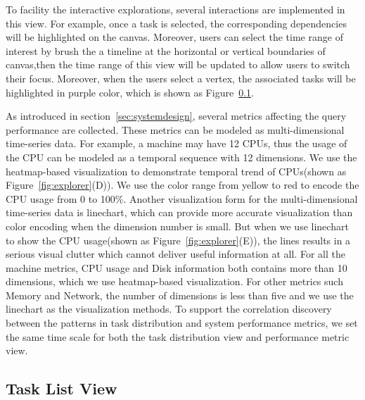 To facility the interactive explorations, several interactions are implemented in this view. For example, once a task is selected, the corresponding dependencies will be highlighted on the canvas. Moreover, users can select the time range of interest by brush the a timeline at the horizontal or vertical boundaries of canvas,then the time range of this view will be updated to allow users to switch their focus. Moreover, when the users select a vertex, the associated tasks will be highlighted in purple color, which is shown as Figure~\ref{}.

As introduced in section~\ref{sec:systemdesign}, several metrics affecting the query performance are collected. These metrics can be modeled as multi-dimensional time-series data. For example, a machine may have 12 CPUs, thus the usage of the CPU can be modeled as a temporal sequence with 12 dimensions. We use the heatmap-based visualization to demonstrate temporal trend of CPUs(shown as Figure~\ref{fig:explorer}(D)). We use the color range from yellow to red to encode the CPU usage from 0 to 100$\%$. Another visualization form for the multi-dimensional time-series data is linechart, which can provide more accurate visualization than color encoding when the dimension number is small. But when we use linechart to show the CPU usage(shown as Figure~\ref{fig:explorer}(E)), the lines results in a serious visual clutter which cannot deliver useful information at all. For all the machine metrics, CPU usage and Disk information both contains more than 10 dimensions, which we use heatmap-based visualization. For other metrics such Memory and Network, the number of dimensions is less than five and we use the linechart as the visualization methods. To support the correlation discovery between the patterns in task distribution and system performance metrics, we set the same time scale for both the task distribution view and performance metric view.

 


\subsection{Task List View}


